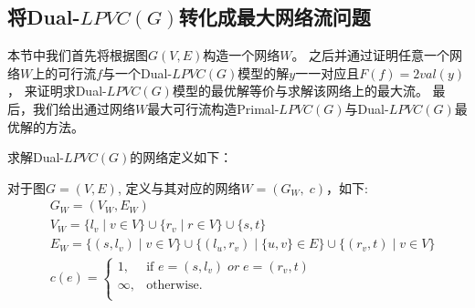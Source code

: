 \subsection{将Dual-$LPVC(G)$转化成最大网络流问题} \label{TransformToNetwork}
本节中我们首先将根据图$G(V, E)$构造一个网络$W$。
之后并通过证明任意一个网络$W$上的可行流$f$与一个Dual-$LPVC(G)$模型的解$y$一一对应且$F(f) = 2val(y)$，
来证明求Dual-$LPVC(G)$模型的最优解等价与求解该网络上的最大流。
最后，我们给出通过网络$W$最大可行流构造Primal-$LPVC(G)$与Dual-$LPVC(G)$最优解的方法。

求解Dual-$LPVC(G)$的网络定义如下：
\begin{definition} \label{NetworkDefintion}
对于图$G = (V, E)$, 定义与其对应的网络$W = (G_W,\; c)$，如下:
\begin{equation*}\begin{aligned}
    &G_W = (V_W, E_W) \\
    &V_W = \{l_v\;|\;v \in V\} \cup \{r_v\;|\;r \in V\} \cup \{ s, t \} \\
    &E_W = \{(s, l_v)\;|\;v \in V\} \cup \{(l_u, r_v)\;|\;\{u, v\} \in E\} \cup \{(r_v, t)\;|\;v \in V\}\\
    &c(e) =   \begin{cases}
        1, & \mbox{if } e = (s, l_v)\;or\;e = (r_v, t)\\
        \infty, & \mbox{otherwise.}\\
  \end{cases}
\end{aligned}\end{equation*}
\end{definition}

